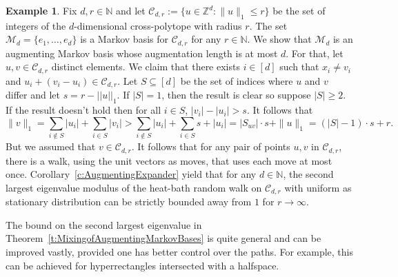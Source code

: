 \documentclass[11pt]{amsart}
\theoremstyle{definition}
\newtheorem{example}[thm]{Example}
\numberwithin{equation}{section}
\newcommand{\ring}[1]{\ensuremath{\mathbb{#1}}}
\renewcommand{\>}{\rangle}
\newcommand{\<}{\langle}
\newcommand{\0}{\mathbf{0}}
\newcommand{\1}{\mathbf{1}}
\newcommand{\2}{\mathbf{2}}
\newcommand\NN{\ring{N}}
\newcommand\ZZ{\ring{Z}}
\newcommand\cC{{\mathcal C}}
\newcommand\cM{{\mathcal M}}
\begin{document}
\begin{example}\label{e:CrossPoly}
Fix $d,r\in\NN$ and let $\cC_{d,r}:=\{u\in\ZZ^d: \|u\|_1\le r\}$ be
the set of integers of the $d$-dimensional cross-polytope with radius
$r$. The set $\cM_d=\{e_1,\dots,e_d\}$
is a Markov basis for
$\cC_{d,r}$ for any $r\in\NN$. We show that $\cM_d$ is an augmenting
Markov basis whose augmentation length is at most $d$. For that, let 
$u,v\in\cC_{d,r}$ distinct elements. We claim that there exists
$i\in[d]$ such that $x_i\neq v_i$ and $u_i+(v_i-u_i)\in\cC_{d,r}$.
Let $S\subseteq[d]$ be the set of indices where $u$ and $v$ differ and let
$s= r- ||u||_1$. If $|S|=1$, then the result is clear so
suppose $|S| \geq 2$. If the result doesn't hold then for all
$i\in S$, $|v_i|-|u_i| > s$. It follows that 
\begin{equation*} 
\|v\|_1 = \sum_{i \notin S} |u_i| + \sum_{i \in S} |v_i|
 > \sum_{i \notin S} |u_i| + \sum_{i \in S} s + |u_i| = |S_{uv}|\cdot s + \|u\|_1
 = (|S|-1) \cdot s + r.
\end{equation*}
But we assumed that $v \in\cC_{d,r}$. It follows that for any pair of
points $u,v$ in $\cC_{d,r}$, there is a walk, using the unit vectors
as moves, that uses each move at most once.
Corollary~\ref{c:AugmentingExpander} yield that for any $d\in\NN$, the
second largest eigenvalue modulus of the heat-bath random walk on
$\cC_{d,r}$ with uniform as stationary distribution can be strictly
bounded away from $1$ for $r\to\infty$.
\end{example}

The bound on the second largest eigenvalue in
Theorem~\ref{t:MixingofAugmentingMarkovBases} is quite general and can
be improved vastly, provided one has better control over the paths.
For example, this can be achieved for hyperrectangles intersected with
a halfspace.
\end{document}
